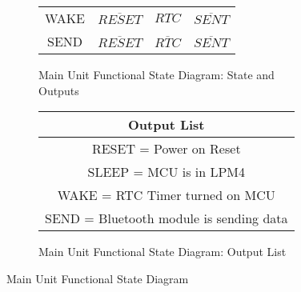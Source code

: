 \begin{landscape}
\begin{figure}[!ht]
\begin{center}
\begin{subfigure}[b]{0.5\textwidth}
\begin{tabular}{c|ccc}
        WAKE&$\overline{RESET}$&$RTC$&$\overline{SENT}$\\
        SEND&$\overline{RESET}$&$\overline{RTC}$&$\overline{SENT}$\\
      \end{tabular}
      \caption{Main Unit Functional State Diagram: State and Outputs}
      \label{fig:main-unit-fsd-state-outputs}
  \end{subfigure}
  \begin{subfigure}[b]{0.5\textwidth}
   \begin{tabular}{|c|}
    \hline
     Output List\\
    \hline
     RESET = Power on Reset\\
     SLEEP = MCU is in LPM4\\
     WAKE = RTC Timer turned on MCU\\
     SEND = Bluetooth module is sending data\\
    \hline
   \end{tabular}
      \caption{Main Unit Functional State Diagram: Output List}
      \label{fig:main-unit-fsd-outputs-list}
  \end{subfigure}
\end{center}
\caption{Main Unit Functional State Diagram}
\label{fig:main-unit-fsd}
\end{figure}
\end{landscape}
